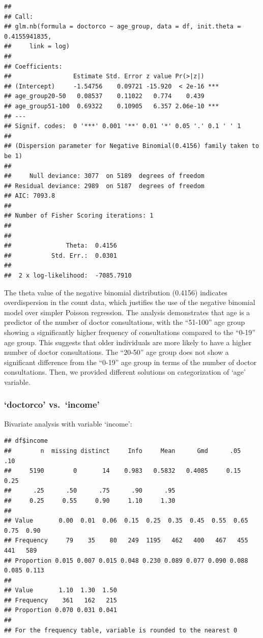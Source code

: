 \documentclass[
]{article}
\newenvironment{Shaded}{\begin{snugshade}}{\end{snugshade}}
\newcommand{\FunctionTok}[1]{\textcolor[rgb]{0.13,0.29,0.53}{\textbf{#1}}}
\newcommand{\NormalTok}[1]{#1}
\newcommand{\SpecialCharTok}[1]{\textcolor[rgb]{0.81,0.36,0.00}{\textbf{#1}}}
\begin{document}
\begin{verbatim}
## 
## Call:
## glm.nb(formula = doctorco ~ age_group, data = df, init.theta = 0.4155941835, 
##     link = log)
## 
## Coefficients:
##                 Estimate Std. Error z value Pr(>|z|)    
## (Intercept)     -1.54756    0.09721 -15.920  < 2e-16 ***
## age_group20-50   0.08537    0.11022   0.774    0.439    
## age_group51-100  0.69322    0.10905   6.357 2.06e-10 ***
## ---
## Signif. codes:  0 '***' 0.001 '**' 0.01 '*' 0.05 '.' 0.1 ' ' 1
## 
## (Dispersion parameter for Negative Binomial(0.4156) family taken to be 1)
## 
##     Null deviance: 3077  on 5189  degrees of freedom
## Residual deviance: 2989  on 5187  degrees of freedom
## AIC: 7093.8
## 
## Number of Fisher Scoring iterations: 1
## 
## 
##               Theta:  0.4156 
##           Std. Err.:  0.0301 
## 
##  2 x log-likelihood:  -7085.7910
\end{verbatim}

The theta value of the negative binomial distribution (0.4156) indicates
overdispersion in the count data, which justifies the use of the
negative binomial model over simpler Poisson regression. The analysis
demonstrates that age is a predictor of the number of doctor
consultations, with the ``51-100'' age group showing a significantly
higher frequency of consultations compared to the ``0-19'' age group.
This suggests that older individuals are more likely to have a higher
number of doctor consultations. The ``20-50'' age group does not show a
significant difference from the ``0-19'' age group in terms of the
number of doctor consultations. Then, we provided different solutions on
categorization of `age' variable.

\subsubsection{`doctorco' vs.~`income'}\label{doctorco-vs.-income}

Bivariate analysis with variable `income':

\begin{Shaded}
\end{Shaded}

\begin{verbatim}
## df$income 
##        n  missing distinct     Info     Mean      Gmd      .05      .10 
##     5190        0       14    0.983   0.5832   0.4085     0.15     0.25 
##      .25      .50      .75      .90      .95 
##     0.25     0.55     0.90     1.10     1.30 
##                                                                             
## Value       0.00  0.01  0.06  0.15  0.25  0.35  0.45  0.55  0.65  0.75  0.90
## Frequency     79    35    80   249  1195   462   400   467   455   441   589
## Proportion 0.015 0.007 0.015 0.048 0.230 0.089 0.077 0.090 0.088 0.085 0.113
##                             
## Value       1.10  1.30  1.50
## Frequency    361   162   215
## Proportion 0.070 0.031 0.041
## 
## For the frequency table, variable is rounded to the nearest 0
\end{verbatim}
\end{document}
